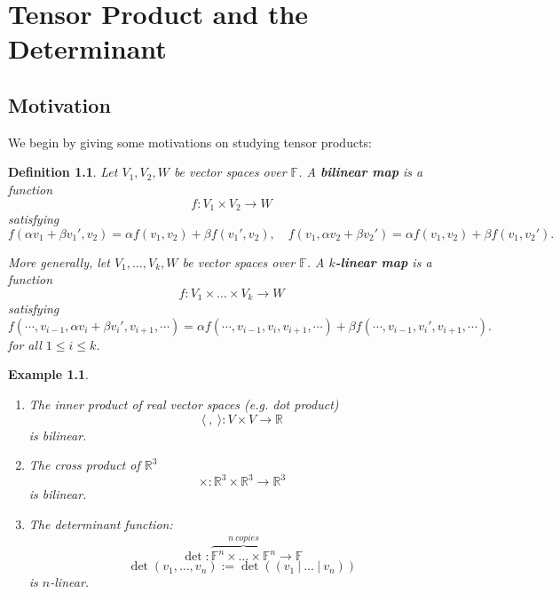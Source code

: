 \documentclass[12pt]{amsbook}
\newtheorem{definition}[theorem]{Definition}
\newtheorem{example}[theorem]{Example}
\begin{document}
\chapter{Tensor Product and the Determinant}

\section{Motivation} We begin by giving some motivations on studying tensor products:

\begin{definition}
Let $V_1, V_2, W$ be vector spaces over $\mathbb{F}$. A {\bf bilinear map} is a function $$f : V_1 \times V_2 \to W$$ satisfying
$$f(\alpha v_1 + \beta v_1', v_2) = \alpha f(v_1, v_2) + \beta f(v_1', v_2), \quad f(v_1, \alpha v_2 + \beta v_2') = \alpha f(v_1, v_2) + \beta f(v_1, v_2').$$

More generally, let $V_1, \dots, V_k, W$ be vector spaces over $\mathbb{F}$. A {\bf $k$-linear map} is a function $$f : V_1 \times \dots \times V_k \to W$$ satisfying
$$f(\cdots, v_{i-1}, \alpha v_i + \beta v_i', v_{i+1}, \cdots) = \alpha f(\cdots, v_{i-1}, v_i, v_{i+1}, \cdots) + \beta f(\cdots, v_{i-1}, v_i', v_{i+1}, \cdots).$$
for all $1 \leq i \leq k$.
\end{definition}

\begin{example} \label{eg-klinear}\
    \begin{enumerate}
        \item The inner product of real vector spaces (e.g. dot product) 
        $$\langle\ ,\ \rangle: V \times V \to \mathbb{R}$$
        is bilinear.
        \item The cross product of $\mathbb{R}^3$ 
        $$\times: \mathbb{R}^3 \times \mathbb{R}^3 \to \mathbb{R}^3$$
        is bilinear.
        \item The determinant function:
        $$\det: \overbrace{\mathbb{F}^n \times \dots \times \mathbb{F}^n}^{n\ copies} \to \mathbb{F}$$
        $$\det(v_1, \dots, v_n) := \det((v_1\ |\ \dots\ |\ v_n))$$
        is $n$-linear.
    \end{enumerate}
\end{example}
\end{document}
